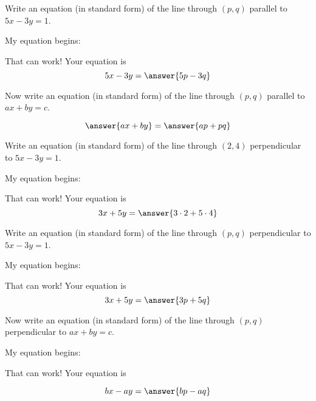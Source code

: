 \documentclass[nooutcomes]{ximera}
\begin{document}
\begin{problem}
Write an equation (in standard form) of the line through $(p,q)$ parallel to $5x-3y=1$.  

My equation begins: 
\begin{multipleChoice}
\end{multipleChoice}
\begin{problem}
That can work!  Your equation is
\[
5x-3y=\answer{5p-3q}
\]
\end{problem}
\end{problem}


\begin{problem}
Now write an equation (in standard form) of the line through $(p,q)$ parallel to $ax+by=c$. 

\begin{prompt}
\[
\answer{ax+by} = \answer{ap+pq}
\]
\end{prompt}
\end{problem}


\begin{problem}
Write an equation (in standard form) of the line through $(2,4)$ perpendicular to $5x-3y=1$.  

My equation begins: 
\begin{multipleChoice}
\end{multipleChoice}
\begin{problem}
That can work!  Your equation is
\[
3x+5y=\answer{3\cdot2+5\cdot4}
\]
\end{problem}
\end{problem}

\begin{problem}
Write an equation (in standard form) of the line through $(p,q)$ perpendicular to $5x-3y=1$.  

My equation begins: 
\begin{multipleChoice}
\end{multipleChoice}
\begin{problem}
That can work!  Your equation is
\[
3x+5y=\answer{3p+5q}
\]
\end{problem}
\end{problem}


\begin{problem}
Now write an equation (in standard form) of the line through $(p,q)$ perpendicular to $ax+by=c$. 

My equation begins: 
\begin{multipleChoice}
\end{multipleChoice}
\begin{problem}
That can work! Your equation is
\begin{prompt}
\[
bx-ay = \answer{bp-aq}
\]
\end{prompt}
\end{problem}
\end{problem}
\end{document}
